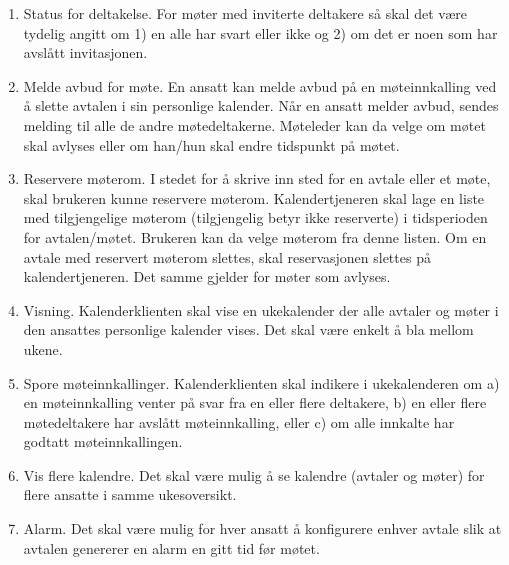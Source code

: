 \begin{enumerate}
\item
Status for deltakelse. For møter med inviterte deltakere så skal det være tydelig angitt om 1) en alle har svart eller ikke og 2) om det er noen som har avslått invitasjonen.

\item
Melde avbud for møte. En ansatt kan melde avbud på en møteinnkalling ved å slette avtalen i sin personlige kalender. Når en ansatt melder avbud, sendes melding til alle de andre møtedeltakerne. Møteleder kan da velge om møtet skal avlyses eller om han/hun skal endre tidspunkt på møtet.

\item
Reservere møterom. I stedet for å skrive inn sted for en avtale eller et møte, skal brukeren kunne reservere møterom. Kalendertjeneren skal lage en liste med tilgjengelige møterom (tilgjengelig betyr ikke reserverte) i tidsperioden for avtalen/møtet. Brukeren kan da velge møterom fra denne listen. Om en avtale med reservert møterom slettes, skal reservasjonen slettes på kalendertjeneren. Det samme gjelder for møter som avlyses.

\item
Visning. Kalenderklienten skal vise en ukekalender der alle avtaler og møter i den ansattes personlige kalender vises. Det skal være enkelt å bla mellom ukene.

\item
Spore møteinnkallinger. Kalenderklienten skal indikere i ukekalenderen om a) en møteinnkalling venter på svar fra en eller flere deltakere, b) en eller flere møtedeltakere har avslått møteinnkalling, eller c) om alle innkalte har godtatt møteinnkallingen.

\item
Vis flere kalendre. Det skal være mulig å se kalendre (avtaler og møter) for flere ansatte i samme ukesoversikt.

\item
Alarm. Det skal være mulig for hver ansatt å konfigurere enhver avtale slik at avtalen genererer en alarm en gitt tid før møtet. 

\end{enumerate}
